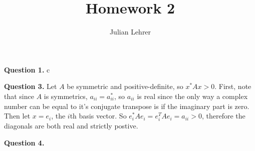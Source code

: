 \documentclass{article}
\title{Homework 2}
\date{}
\author{Julian Lehrer}
\begin{document}
\maketitle
\textbf{Question 1.} c

\textbf{Question 3.} Let $A$ be symmetric and positive-definite, so $x^*Ax > 0$. First, note that since $A$ is symmetrics, $a_{ii}=a_{ii}^*$, so $a_{ii}$ is real since the only way a complex number can be equal to it's conjugate transpose is if the imaginary part is zero. Then let $x=e_i$, the $i$th basis vector. So $e_i^* A e_i = e_i^T A e_i = a_{ii} > 0$, therefore the diagonals are both real and strictly postive. 

\textbf{Question 4.} 
\end{document}
